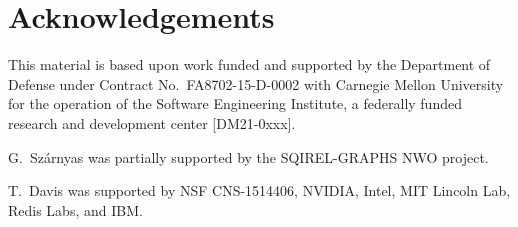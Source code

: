 \section*{Acknowledgements}


This material is based upon work funded and supported by the Department of
Defense under Contract No.~FA8702-15-D-0002 with Carnegie Mellon University for
the operation of the Software Engineering Institute, a federally funded research
and development center [DM21-0xxx].

G.~Sz\'arnyas was partially supported by the SQIREL-GRAPHS NWO project.

T.~Davis was supported by
NSF CNS-1514406, NVIDIA, Intel, MIT Lincoln Lab,
Redis Labs, and IBM.

